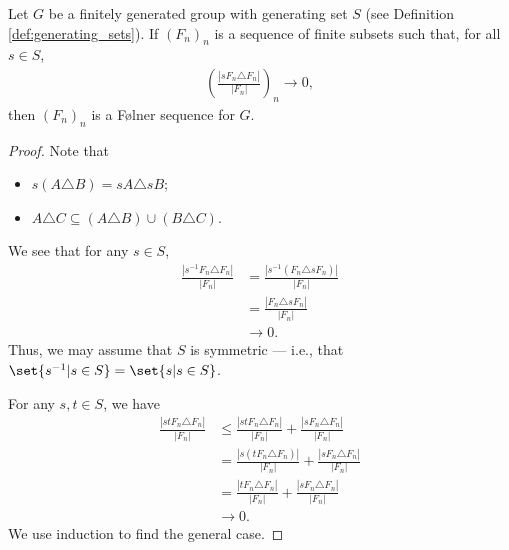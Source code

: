 \begin{lemma}\label{lemma:folner_condition_generating_set}
  Let $G$ be a finitely generated group with generating set $S$ (see Definition \ref{def:generating_sets}). If $\left(F_n\right)_n$ is a sequence of finite subsets such that, for all $s\in S$,
  \begin{align*}
    \left(\frac{\left\vert sF_n\triangle F_n \right\vert}{\left\vert F_n \right\vert}\right)_n\rightarrow 0,
  \end{align*}
  then $\left(F_n\right)_n$ is a Følner sequence for $G$.
\end{lemma}
\begin{proof}
  Note that
  \begin{itemize}
    \item $s\left(A\triangle B\right) = sA\triangle sB$;
    \item $A\triangle C \subseteq \left(A\triangle B\right) \cup \left(B\triangle C\right)$.
  \end{itemize}
  We see that for any $s\in S$,
  \begin{align*}
    \frac{\left\vert s^{-1}F_n\triangle F_n \right\vert}{\left\vert F_n \right\vert} &= \frac{\left\vert s^{-1}\left(F_n\triangle sF_n\right) \right\vert}{\left\vert F_n \right\vert}\\
                                                                                     &= \frac{\left\vert F_n\triangle sF_n \right\vert}{\left\vert F_n \right\vert}\\
                                                                                     &\rightarrow 0.
  \end{align*}
  Thus, we may assume that $S$ is symmetric --- i.e., that $\set{s^{-1}| s\in S} = \set{s | s\in S}$.\newline

  For any $s,t\in S$, we have
  \begin{align*}
    \frac{\left\vert stF_n\triangle F_n \right\vert}{\left\vert F_n \right\vert} &\leq \frac{\left\vert stF_n\triangle F_n \right\vert}{\left\vert F_n \right\vert} + \frac{\left\vert sF_n\triangle F_n \right\vert}{\left\vert F_n \right\vert}\\
                                                                                 &= \frac{\left\vert s\left(tF_n\triangle F_n\right) \right\vert}{\left\vert F_n \right\vert} + \frac{\left\vert sF_n\triangle F_n \right\vert}{\left\vert F_n \right\vert}\\
                                                                                 &= \frac{\left\vert tF_n\triangle F_n \right\vert}{\left\vert F_n \right\vert} + \frac{\left\vert sF_n\triangle F_n \right\vert}{\left\vert F_n \right\vert}\\
                                                                                 &\rightarrow 0.
  \end{align*}
  We use induction to find the general case.
\end{proof}
